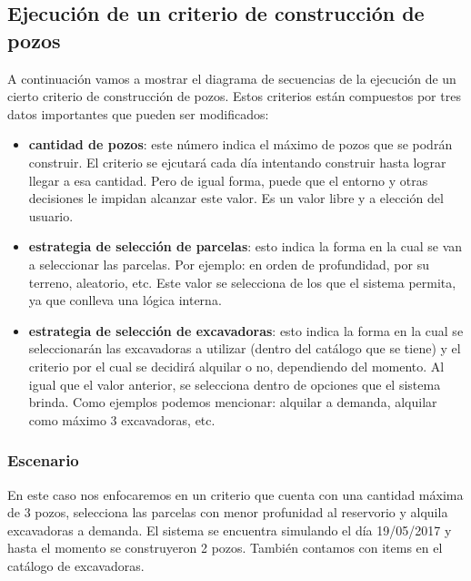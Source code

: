 \subsection{Ejecución de un criterio de construcción de pozos}

\par A continuación vamos a mostrar el diagrama de secuencias de la ejecución de un cierto criterio de construcción de pozos. Estos criterios están compuestos por tres datos importantes que pueden ser modificados:

\begin{itemize}
  \item \textbf{cantidad de pozos}: este número indica el máximo de pozos que se podrán construir. El criterio se ejcutará cada día intentando construir hasta lograr llegar a esa cantidad. Pero de igual forma, puede que el entorno y otras decisiones le impidan alcanzar este valor. Es un valor libre y a elección del usuario.
  \item \textbf{estrategia de selección de parcelas}: esto indica la forma en la cual se van a seleccionar las parcelas. Por ejemplo: en orden de profundidad, por su terreno, aleatorio, etc. Este valor se selecciona de los que el sistema permita, ya que conlleva una lógica interna.

  \item \textbf{estrategia de selección de excavadoras}: esto indica la forma en la cual se seleccionarán las excavadoras a utilizar (dentro del catálogo que se tiene) y el criterio por el cual se decidirá alquilar o no, dependiendo del momento. Al igual que el valor anterior, se selecciona dentro de opciones que el sistema brinda. Como ejemplos podemos mencionar: alquilar a demanda, alquilar como máximo 3 excavadoras, etc.
\end{itemize}

\subsubsection{Escenario}
\par En este caso nos enfocaremos en un criterio que cuenta con una cantidad máxima de 3 pozos, selecciona las parcelas con menor profunidad al reservorio y alquila excavadoras a demanda. El sistema se encuentra simulando el día 19/05/2017 y hasta el momento se construyeron 2 pozos. También contamos con items en el catálogo de excavadoras.

